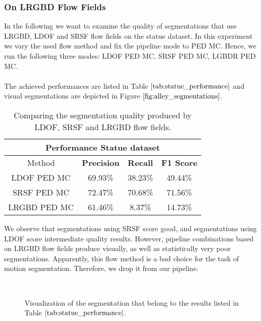 \subsubsection{On LRGBD Flow Fields}
In the following we want to examine the quality of segmentations that use LRGBD, LDOF and SRSF flow fields on the statue dataset. In this experiment we vary the used flow method and fix the pipeline mode to PED MC. Hence, we run the following three modes: LDOF PED MC, SRSF PED MC, LGBDR PED MC. \\ \\
The achieved performances are listed in Table $\ref{tab:statue_performance}$ and visual segmentations are depicted in Figure $\ref{fig:alley_segmentations}$.
\begin{table}[H]
\centering
\begin{tabular}{|c|c|c|c|}
\hline
\multicolumn{4}{|c|}{Performance Statue dataset}                        \\ \hline
Method & \textbf{Precision} & \textbf{Recall} & \textbf{F1 Score} \\ \hline
LDOF PED MC & 69.93\%   & 38.23\%     & 49.44\%  \\ \hline
SRSF PED MC & 72.47\%   & 70.68\%     & 71.56\%  \\ \hline
LRGBD PED MC & 61.46\%   & 8.37\%     & 14.73\%  \\ \hline              
\end{tabular}
\caption[Performance Statue]{Comparing the segmentation quality produced by LDOF, SRSF and LRGBD flow fields.}
\label{tab:statue_performance}
\end{table}
We observe that segmentations using SRSF score good, and segmentations using LDOF score intermediate quality results. However, pipeline combinations based on LRGBD flow fields produce visually, as well as statistically very poor segmentations. Apparently, this flow method is a bad choice for the task of motion segmentation. Therefore, we drop it from our pipeline. 
\begin{figure}[H]
\begin{center}
~
\end{center}
\caption[Bonn Cerealbox Segmentations]{Visualization of the segmentation that belong to the results listed in Table $\ref{tab:statue_performance}$.}
\label{fig:alley_segmentations}
\end{figure}
